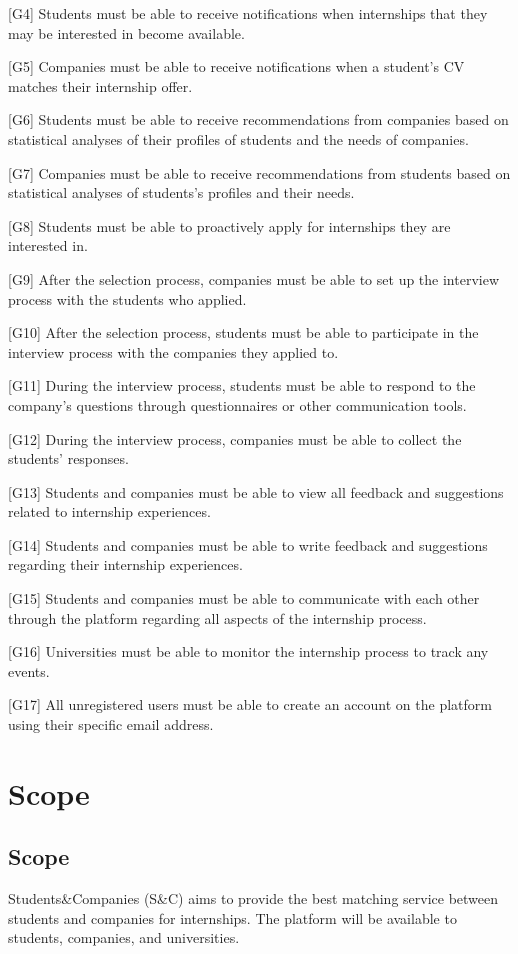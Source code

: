 [G4] Students must be able to receive notifications when internships that they may be interested in become available.

[G5] Companies must be able to receive notifications when a student's CV matches their internship offer.

[G6] Students must be able to receive recommendations from companies based on statistical analyses of their profiles of students and the needs of companies.

[G7] Companies must be able to receive recommendations from students based on statistical analyses of students's profiles and their needs.

[G8] Students must be able to proactively apply for internships they are interested in.

[G9] After the selection process, companies must be able to set up the interview process with the students who applied.

[G10] After the selection process, students must be able to participate in the interview process with the companies they applied to.

[G11] During the interview process, students must be able to respond to the company's questions through questionnaires or other communication tools.

[G12] During the interview process, companies must be able to collect the students' responses.

[G13] Students and companies must be able to view all feedback and suggestions related to internship experiences.

[G14] Students and companies must be able to write feedback and suggestions regarding their internship experiences.

[G15] Students and companies must be able to communicate with each other through the platform regarding all aspects of the internship process.

[G16] Universities must be able to monitor the internship process to track any events.

[G17] All unregistered users must be able to create an account on the platform using their specific email address.

\newpage
\section{Scope}
\label{sec:scope}
\subsection{Scope}
\label{subsec:scope}
Students\&Companies (S\&C) aims to provide the best matching service between students and companies for internships. The platform will be available
to students, companies, and universities.

